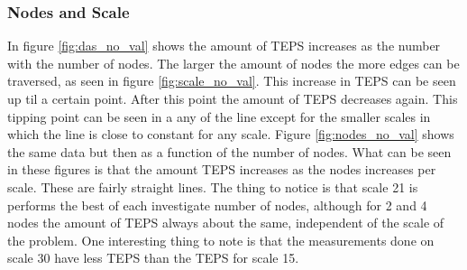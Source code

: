 \subsubsection{Nodes and Scale}
\label{res:nodes_scale}
In figure \ref{fig:das_no_val} shows the amount of TEPS increases as the number with the number of nodes. The larger the amount of nodes the more edges can be traversed, as seen in figure \ref{fig:scale_no_val}. This increase in TEPS can be seen up til a certain point. After this point the amount of TEPS decreases again. This tipping point can be seen in a any of the line except for the smaller scales in which the line is close to constant for any scale.
Figure \ref{fig:nodes_no_val} shows the same data but then as a function of the number of nodes. What can be seen in these figures is that the amount TEPS increases as the nodes increases per scale. These are fairly straight lines. The thing to notice is that scale 21 is performs the best of each investigate number of nodes, although for 2 and 4 nodes the amount of TEPS always about the same, independent of the scale of the problem.
One interesting thing to note is that the measurements done on scale 30 have less TEPS than the TEPS for scale 15.

